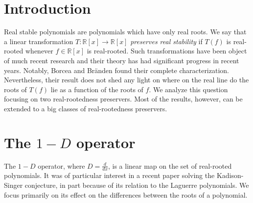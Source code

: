 \documentclass[a0,landscape]{a0poster}
\begin{document}

\begin{multicols}{2} %


\color{DarkSlateGray} %


\section*{Introduction}
Real stable polynomials are polynomials which have only real roots. We say that a linear transformation $T:\mathbb{R}[x]\to\mathbb{R}[x]$ \emph{preserves real stability} if $T(f)$ is real-rooted whenever $f\in\mathbb{R}[x]$ is real-rooted.  Such transformations have been object of much recent research and their theory has had significant progress in recent years. Notably, Borcea and Br\"{a}nden found their complete characterization. Nevertheless, their result does not shed any light on where on the real line do the roots of $T(f)$ lie as a function of the roots of $f$. We analyze this question focusing on two real-rootedness preservers. Most of the results, however, can be extended to a big classes of real-rootedness preservers.



\section*{The $1-D$ operator}
The $1-D$ operator, where $D=\frac{d}{dx}$, is a linear map on the set of real-rooted polynomials. It was of particular interest in a recent paper solving the Kadison-Singer conjecture, in part because of its relation to the Laguerre polynomials. We focus primarily on its effect on the differences between the roots of a polynomial.



\end{multicols}
\end{document}
